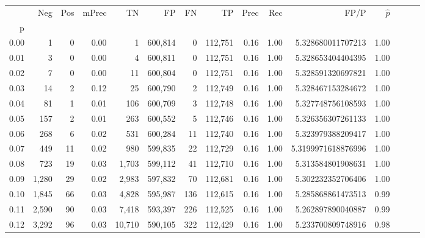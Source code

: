\begin{tabular}{rrrrrrrrrrrrrrr}
\toprule
{} &     Neg &    Pos & mPrec &       TN &       FP &       FN &       TP &  Prec &   Rec &                   FP/P & $\hat{p}$ \\
p    &         &        &       &          &          &          &          &       &       &                        &           \\
\midrule
0.00 &       1 &      0 &  0.00 &        1 &  600,814 &        0 &  112,751 &  0.16 &  1.00 &      5.328680011707213 &      1.00 \\
0.01 &       3 &      0 &  0.00 &        4 &  600,811 &        0 &  112,751 &  0.16 &  1.00 &      5.328653404404395 &      1.00 \\
0.02 &       7 &      0 &  0.00 &       11 &  600,804 &        0 &  112,751 &  0.16 &  1.00 &      5.328591320697821 &      1.00 \\
0.03 &      14 &      2 &  0.12 &       25 &  600,790 &        2 &  112,749 &  0.16 &  1.00 &      5.328467153284672 &      1.00 \\
0.04 &      81 &      1 &  0.01 &      106 &  600,709 &        3 &  112,748 &  0.16 &  1.00 &      5.327748756108593 &      1.00 \\
0.05 &     157 &      2 &  0.01 &      263 &  600,552 &        5 &  112,746 &  0.16 &  1.00 &      5.326356307261133 &      1.00 \\
0.06 &     268 &      6 &  0.02 &      531 &  600,284 &       11 &  112,740 &  0.16 &  1.00 &      5.323979388209417 &      1.00 \\
0.07 &     449 &     11 &  0.02 &      980 &  599,835 &       22 &  112,729 &  0.16 &  1.00 &     5.3199971618876996 &      1.00 \\
0.08 &     723 &     19 &  0.03 &    1,703 &  599,112 &       41 &  112,710 &  0.16 &  1.00 &      5.313584801908631 &      1.00 \\
0.09 &   1,280 &     29 &  0.02 &    2,983 &  597,832 &       70 &  112,681 &  0.16 &  1.00 &      5.302232352706406 &      1.00 \\
0.10 &   1,845 &     66 &  0.03 &    4,828 &  595,987 &      136 &  112,615 &  0.16 &  1.00 &      5.285868861473513 &      0.99 \\
0.11 &   2,590 &     90 &  0.03 &    7,418 &  593,397 &      226 &  112,525 &  0.16 &  1.00 &      5.262897890040887 &      0.99 \\
0.12 &   3,292 &     96 &  0.03 &   10,710 &  590,105 &      322 &  112,429 &  0.16 &  1.00 &      5.233700809748916 &      0.98 \\

\end{tabular}
